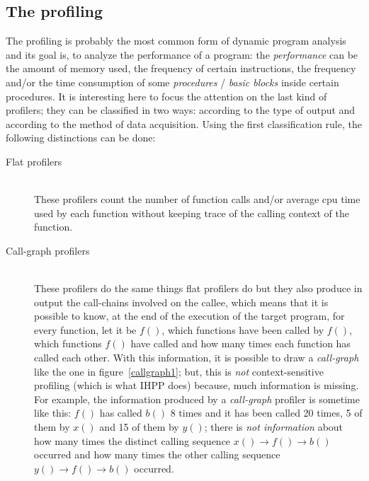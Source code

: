 \documentclass[a4paper,10pt]{report}
\begin{document}
\subsection{The profiling}
The profiling is probably the most common form of dynamic program analysis and
its goal is, to analyze the performance of a program: the
\emph{performance} can be the amount of memory used, the frequency of certain
instructions, the frequency and/or the time consumption of some
\emph{procedures} / \emph{basic blocks} inside certain procedures. 
It is interesting here to focus the attention on the last kind of profilers; 
they can be classified in two ways: according to the type of output and according to the method of data acquisition. Using the first classification rule, the following distinctions can be done:

\begin{description}
\item[Flat profilers] \hfill \\
These profilers count the number of function calls and/or average cpu time used
by each function without keeping trace of the calling context of the function.
\item[Call-graph profilers] \hfill \\
These profilers do the same things flat profilers do but they also produce in output
the call-chains involved on the callee, which means that it is possible to know,
at the end of the execution of the target program, for every function, let it be
$f()$, which functions have been called by $f()$, which functions $f()$ have called and how many times each function has called each other. With this
information, it is possible to draw a
\emph{call-graph} like the one in figure~\ref{callgraph1}; but, this is
\emph{not} context-sensitive profiling (which is what IHPP does) because,
much information is missing. 
For example, the information produced by a \emph{call-graph} profiler 
is sometime like this: $f()$ has called $b()$ 8 times and it has been called 20
times, 5 of them by $x()$ and 15 of them by $y()$; there is \emph{not information} about how many times the distinct calling sequence $x()\rightarrow f()\rightarrow b()$ occurred and how
many times the other calling sequence $y()\rightarrow f()\rightarrow b()$
occurred.

\begin{figure}

\begin{center}

\begin{tikzpicture}
[->,>=stealth',shorten >=1pt,
node distance=1.5cm,
minimum size=7mm,
main node/.style={circle, draw, font=\itshape\large}]


\end{tikzpicture}
\end{center}
\end{figure}
\end{description}
\end{document}
